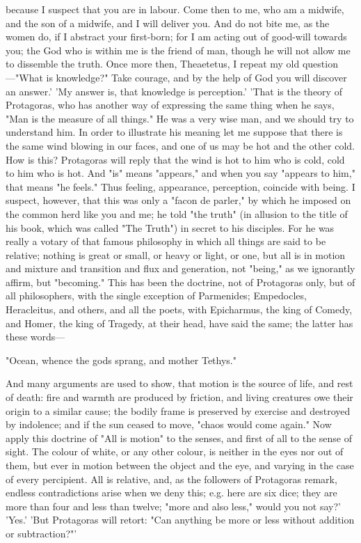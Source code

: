 \documentclass[11pt,letter]{article}
\begin{document}
because I suspect that you are in labour. Come then to me, who am a midwife, and the son of a midwife, and I will deliver you. And do not bite me, as the women do, if I abstract your first-born; for I am acting out of good-will towards you; the God who is within me is the friend of man, though he will not allow me to dissemble the truth. Once more then, Theaetetus, I repeat my old question—"What is knowledge?" Take courage, and by the help of God you will discover an answer.' 'My answer is, that knowledge is perception.' 'That is the theory of Protagoras, who has another way of expressing the same thing when he says, "Man is the measure of all things." He was a very wise man, and we should try to understand him. In order to illustrate his meaning let me suppose that there is the same wind blowing in our faces, and one of us may be hot and the other cold. How is this? Protagoras will reply that the wind is hot to him who is cold, cold to him who is hot. And "is" means "appears," and when you say "appears to him," that means "he feels." Thus feeling, appearance, perception, coincide with being. I suspect, however, that this was only a "facon de parler," by which he imposed on the common herd like you and me; he told "the truth" (in allusion to the title of his book, which was called "The Truth") in secret to his disciples. For he was really a votary of that famous philosophy in which all things are said to be relative; nothing is great or small, or heavy or light, or one, but all is in motion and mixture and transition and flux and generation, not "being," as we ignorantly affirm, but "becoming." This has been the doctrine, not of Protagoras only, but of all philosophers, with the single exception of Parmenides; Empedocles, Heracleitus, and others, and all the poets, with Epicharmus, the king of Comedy, and Homer, the king of Tragedy, at their head, have said the same; the latter has these words—

\par  "Ocean, whence the gods sprang, and mother Tethys."

\par  And many arguments are used to show, that motion is the source of life, and rest of death: fire and warmth are produced by friction, and living creatures owe their origin to a similar cause; the bodily frame is preserved by exercise and destroyed by indolence; and if the sun ceased to move, "chaos would come again." Now apply this doctrine of "All is motion" to the senses, and first of all to the sense of sight. The colour of white, or any other colour, is neither in the eyes nor out of them, but ever in motion between the object and the eye, and varying in the case of every percipient. All is relative, and, as the followers of Protagoras remark, endless contradictions arise when we deny this; e.g. here are six dice; they are more than four and less than twelve; "more and also less," would you not say?' 'Yes.' 'But Protagoras will retort: "Can anything be more or less without addition or subtraction?"'
\end{document}
